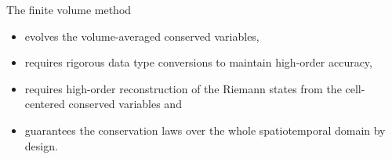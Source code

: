 The finite volume method
\begin{itemize}
    \item evolves the volume-averaged conserved variables,
    \item requires rigorous data type conversions to maintain high-order accuracy,
    \item requires high-order reconstruction of the Riemann states from the cell-centered conserved variables and
    \item guarantees the conservation laws over the whole spatiotemporal domain by design.
\end{itemize}
